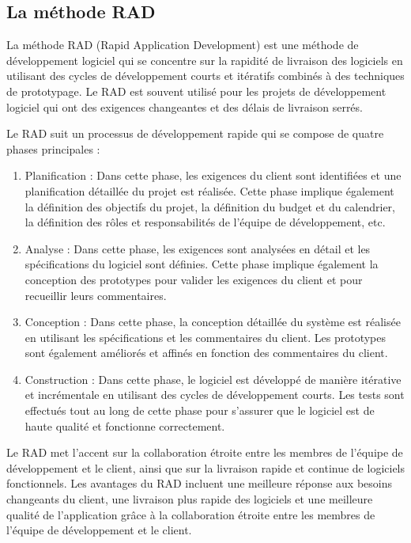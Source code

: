\subsection{La méthode RAD}\label{subsec:methode-rad}
La méthode RAD (Rapid Application Development) est une méthode de développement logiciel qui se concentre sur la rapidité de livraison des logiciels en utilisant des cycles de développement courts et itératifs combinés à des techniques de prototypage. Le RAD est souvent utilisé pour les projets de développement logiciel qui ont des exigences changeantes et des délais de livraison serrés.

Le RAD suit un processus de développement rapide qui se compose de quatre phases principales :

\begin{enumerate}
    \item Planification : Dans cette phase, les exigences du client sont identifiées et une planification détaillée du projet est réalisée. Cette phase implique également la définition des objectifs du projet, la définition du budget et du calendrier, la définition des rôles et responsabilités de l'équipe de développement, etc.
    \item Analyse : Dans cette phase, les exigences sont analysées en détail et les spécifications du logiciel sont définies. Cette phase implique également la conception des prototypes pour valider les exigences du client et pour recueillir leurs commentaires.
    \item Conception : Dans cette phase, la conception détaillée du système est réalisée en utilisant les spécifications et les commentaires du client. Les prototypes sont également améliorés et affinés en fonction des commentaires du client.
    \item Construction : Dans cette phase, le logiciel est développé de manière itérative et incrémentale en utilisant des cycles de développement courts. Les tests sont effectués tout au long de cette phase pour s'assurer que le logiciel est de haute qualité et fonctionne correctement.
\end{enumerate}
Le RAD met l'accent sur la collaboration étroite entre les membres de l'équipe de développement et 
le client, ainsi que sur la livraison rapide et continue de logiciels fonctionnels. 
Les avantages du RAD incluent une meilleure réponse aux besoins changeants du client,
une livraison plus rapide des logiciels et une meilleure qualité de l'application grâce
à la collaboration étroite entre les membres de l'équipe de développement et le client.

